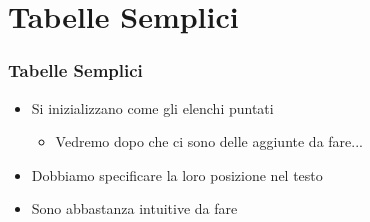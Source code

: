 \section{Tabelle Semplici}
\begin{frame}

  \frametitle{Tabelle Semplici}
  
  \begin{itemize}
   \item Si inizializzano come gli elenchi puntati
   \begin{itemize}
    \item Vedremo dopo che ci sono delle aggiunte da fare...
   \end{itemize}
   \item Dobbiamo specificare la loro posizione nel testo
   \item Sono abbastanza intuitive da fare
  \end{itemize}
  

\end{frame}
